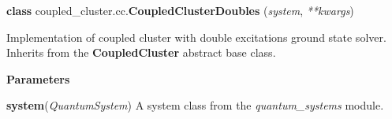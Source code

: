 \begin{tcolorbox}
    {\selectfont
    \textbf{class} coupled\_cluster.cc.\textbf{CoupledClusterDoubles}
    (\emph{system}, \emph{**kwargs})

    \vspace{1em}
    Implementation of coupled cluster with double excitations ground state solver. 
    Inherits from the \textbf{CoupledCluster} abstract base class.
    \vspace{1em}

    \textbf{Parameters}

    \hspace{2em}\textbf{system}(\emph{QuantumSystem}) A system class from the 
        \emph{quantum\_systems} module.
    } 
\end{tcolorbox}